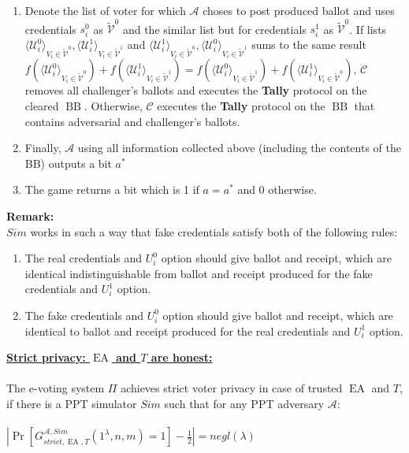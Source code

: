 \documentclass[12pt]{article}
\DeclareMathOperator{\ea}{EA}
\DeclareMathOperator{\bb}{BB}
\begin{document}
\begin{enumerate}
\begin{enumerate}
\end{enumerate}
\item Denote the list of voter for which $\mathcal{A}$ choses to post produced ballot and uses credentials $s_i^0$  as $ \tilde{\mathcal{V}}^0$ and the similar list but for credentials $s_i^1$ as $ \tilde{\mathcal{V}}^0$.  If  lists $\langle \mathcal{U}^0_i \rangle _{V_i \in \tilde{\mathcal{V}}^0}, \langle \mathcal{U}^1_i \rangle _{V_i \in \tilde{\mathcal{V}}^1}$ and $\langle \mathcal{U}^1_i \rangle _{V_i \in \tilde{\mathcal{V}}^0}, \langle \mathcal{U}^0_i \rangle _{V_i \in \tilde{\mathcal{V}}^1}$ sums to the same result $f(\langle \mathcal{U}^0_i \rangle _{V_i \in \tilde{\mathcal{V}}^0} ) + f(\langle \mathcal{U}^1_i \rangle _{V_i \in \tilde{\mathcal{V}}^1} ) =  f(\langle \mathcal{U}^0_i \rangle _{V_i \in \tilde{\mathcal{V}}^1} ) +  f(\langle \mathcal{U}^1_i \rangle _{V_i \in \tilde{\mathcal{V}}^0} )$, $\mathcal{C}$ removes all challenger's ballots and executes the \textbf{Tally} protocol on the cleared $\bb$. Otherwise, $\mathcal{C}$ executes the \textbf{Tally} protocol on the $\bb$ that contains adversarial and challenger's ballots. 
\item Finally, $\mathcal{A}$ using all information collected above (including the contents of the BB) outputs a bit $a^*$
\item  The game returns a bit which is 1 if $a = a^*$ and 0 otherwise.
\end{enumerate}


\textbf{Remark:}\\
$Sim$ works in such a way that fake credentials satisfy both of the following rules: 
\begin{enumerate}
 \item The real credentials and $U_i^0$ option  should give ballot and receipt, which are identical indistinguishable from ballot and receipt produced for the fake credentials and  $U_i^1$ option.
 \item The fake credentials and $U_i^0$ option  should give ballot and receipt, which are identical to ballot and receipt produced for the real credentials and  $U_i^1$ option.
 \end{enumerate}
 
\underline{\textbf{Strict privacy: $\ea$ and $T$ are honest:}}\\\\
The e-voting system $\Pi$ achieves strict voter privacy in case of trusted $\ea$ and $T$, if there is a PPT simulator $Sim$ such that for any PPT adversary $\mathcal{A}$:\\\\
 $|\Pr[G_{strict,\ea,T}^{\mathcal{A}, Sim}(1^{\lambda},n,m) = 1]- \frac{1}{2} |= negl(\lambda)$
\end{document}
